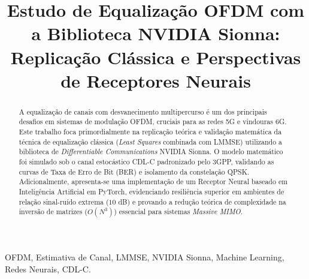 \documentclass[conference]{IEEEtran}
\begin{document}
\title{Estudo de Equalização OFDM com a Biblioteca NVIDIA Sionna: Replicação Clássica e Perspectivas de Receptores Neurais}

\author{
}


\maketitle

\begin{abstract}
A equalização de canais com desvanecimento multipercurso é um dos principais desafios em sistemas de modulação OFDM, cruciais para as redes 5G e vindouras 6G. Este trabalho foca primordialmente na replicação teórica e validação matemática da técnica de equalização clássica (\textit{Least Squares} combinada com LMMSE) utilizando a biblioteca de \textit{Differentiable Communications} NVIDIA Sionna. O modelo matemático foi simulado sob o canal estocástico CDL-C padronizado pelo 3GPP, validando as curvas de Taxa de Erro de Bit (BER) e isolamento da constelação QPSK. Adicionalmente, apresenta-se uma implementação de um Receptor Neural baseado em Inteligência Artificial em PyTorch, evidenciando resiliência superior em ambientes de relação sinal-ruído extrema ($10$ dB) e provando a redução teórica de complexidade na inversão de matrizes ($O(N^3)$) essencial para sistemas \textit{Massive MIMO}.
\end{abstract}

\begin{IEEEkeywords}
OFDM, Estimativa de Canal, LMMSE, NVIDIA Sionna, Machine Learning, Redes Neurais, CDL-C.
\end{IEEEkeywords}

\end{document}
